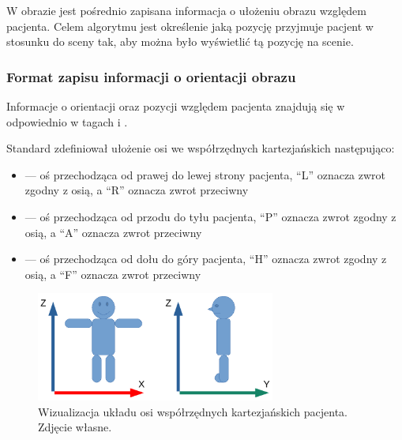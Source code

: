 \label{sec:algorithm-imageorientationindicator}

W obrazie \DICOM jest pośrednio zapisana informacja o ułożeniu obrazu względem pacjenta.
Celem algorytmu jest określenie jaką pozycję przyjmuje pacjent w stosunku do sceny tak, aby można było wyświetlić tą pozycję na scenie.

\subsubsection{Format zapisu informacji o orientacji obrazu}

\par
Informacje o orientacji oraz pozycji względem pacjenta znajdują się w odpowiednio w tagach  i .

\par
Standard \DICOM zdefiniował ułożenie osi we współrzędnych kartezjańskich następująco:
\begin{itemize}
    \item {} --- oś przechodząca od prawej do lewej strony pacjenta, \enquote{L} oznacza zwrot zgodny z osią, a \enquote{R} oznacza zwrot przeciwny

    \item {} --- oś przechodząca od przodu do tyłu pacjenta, \enquote{P} oznacza zwrot zgodny z osią, a \enquote{A} oznacza zwrot przeciwny

    \item {} --- oś przechodząca od dołu do góry pacjenta, \enquote{H} oznacza zwrot zgodny z osią, a \enquote{F} oznacza zwrot przeciwny

\end{itemize}

\begin{figure}[!htbp]
    \centering
    \includegraphics[width=0.7\textwidth]{img/imageorientationindicator-003.pdf}
    \caption{Wizualizacja układu osi współrzędnych kartezjańskich pacjenta. Zdjęcie własne.}
    \label{fig:imageorientationindicator2}
\end{figure}

